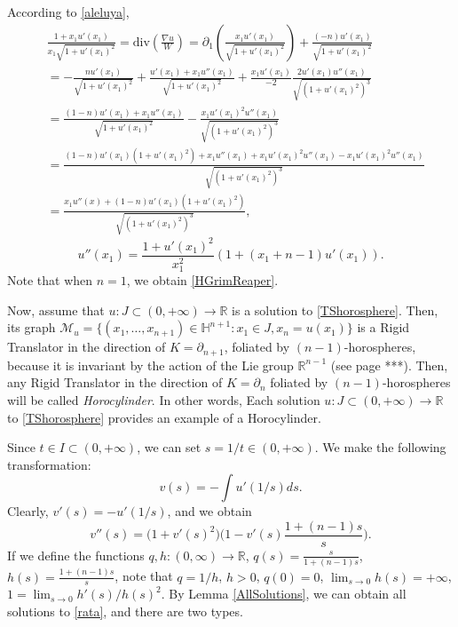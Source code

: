 \documentclass[12pt]{article}
\numberwithin{lemma}{section}
\newcommand{\R}{\mathbb{R}}
\begin{document}
{According to \eqref{aleluya},
\begin{align*}
& \frac{1+x_1 u'(x_1)}{x_1\sqrt{1+u'(x_1)^2}}  
= \mathrm{div}\left(\frac{\nabla u}{W}\right) 
= \partial_1\left( \frac{x_1 u'(x_1)}{\sqrt{1+u'(x_1)^2}}  \right) + 
\frac{(-n)u'(x_1)}{\sqrt{1+u'(x_1)^2}} \\
& = -\frac{n u'(x_1)}{\sqrt{1+u'(x_1)^2}} +\frac{u'(x_1)+x_1u''(x_1)}{\sqrt{1+u'(x_1)^2}} +
\frac{x_1 u'(x_1)}{ -2  } \frac{2u'(x_1) u''(x_1)}{\sqrt{(1+u'(x_1)^2)^3}} \\
& = \frac{(1-n)u'(x_1)  +x_1u''(x_1)}{\sqrt{1+u'(x_1)^2}} 
- \frac{x_1 u'(x_1)^2  u''(x_1)}{\sqrt{(1+u'(x_1)^2)^3}}
\\
& = \frac{(1-n)u'(x_1)(1+u'(x_1)^2)+x_1u''(x_1)+x_1u'(x_1)^2u''(x_1)-x_1u'(x_1)^2u''(x_1)
}{\sqrt{(1+u'(x_1)^2)^3}} \\
& = \frac{ x_1 u''(x) +(1-n) u'(x_1)(1+u'(x_1)^2)}{\sqrt{(1+u'(x_1)^2)^3}},  
\end{align*}
\begin{equation}\label{TShorosphere}
u''(x_1) =\frac{1+u'(x_1)^2}{x_1^2}\left ( 1+(x_1+n-1)u'(x_1)\right). 
\end{equation}
Note that when $n=1$, we obtain \eqref{HGrimReaper}.

Now, assume that $u:J\subset (0,+\infty)\rightarrow\R$ is a solution to \eqref{TShorosphere}. Then, its graph  $\mathcal{M}_u=\{(x_1,\ldots,x_{n+1})\in\mathbb{H}^{n+1} : x_1\in J, x_n=u(x_1) \}$ is a Rigid Translator in the direction of $K=\partial_{n+1}$, foliated by $(n-1)$-horospheres, because it is invariant by the action of the Lie group $\R^{n-1}$ (see page ***). Then, any Rigid Translator in the direction of $K=\partial_n$ foliated by $(n-1)$-horospheres will be called \textit{Horocylinder}. In other words, Each solution $u:J\subset (0,+\infty)\rightarrow\R$ to \eqref{TShorosphere} provides  an example of a Horocylinder.

Since $t\in I\subset(0,+\infty)$, we can set $s=1/t\in(0,+\infty)$. We make the following transformation:
\[ v(s) = -\int u'(1/s)ds. 
\]
Clearly, $v'(s)=-u'(1/s)$, and we obtain 
\begin{equation}\label{rata}
v''(s) = \big(1+v'(s)^2\big) \Big( 1- v'(s)\frac{1+(n-1)s}{s}\Big).
\end{equation}
If we define the functions $q,h:(0,\infty)\rightarrow\R$, $q(s)=\frac{s}{1+(n-1)s}$, $h(s)=\frac{1+(n-1)s}{s}$, note that $q=1/h$, $h>0$, $q(0)=0$, $\lim_{s\to 0}h(s)=+\infty$, $1=\lim_{s\to 0} h'(s)/h(s)^2$. By Lemma \ref{AllSolutions}, we can obtain all solutions to \eqref{rata}, and there are two types. 

}
\end{document}
